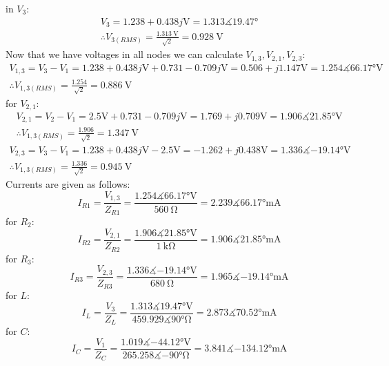 \documentclass[letterpaper]{article}
\begin{document}
in $V_3$:
\begin{gather*}
    V_3 = 1.238+0.438j\si{\volt} = 1.313\measuredangle\ang{19.47}\\ 
    \therefore V_{3(RMS)} = \frac{\SI{1.313}{\volt}}{\sqrt{2}} = \SI{0.928}{\volt} 
\end{gather*}
Now that we have voltages in all nodes we can calculate $V_{1,3},V_{2,1},V_{2,3}$:
\begin{gather*}
    V_{1,3} = V_3 - V_1 = 1.238+0.438j\si{\volt} + 0.731-0.709j\si{\volt} = 0.506+j1.147\si{\volt} =
    1.254\measuredangle\ang{66.17}\si{\volt}\\
    \therefore V_{1,3(RMS)} = \frac{1.254}{\sqrt{2}} = \SI{0.886}{\volt}
\end{gather*}
for $V_{2,1}$:
\begin{gather*}
    V_{2,1} = V_2 - V_1 = 2.5\si{\volt} + 0.731-0.709j\si{\volt} = 1.769+j0.709\si{\volt} =
    1.906\measuredangle\ang{21.85}\si{\volt}\\
    \therefore V_{1,3(RMS)} = \frac{1.906}{\sqrt{2}} = \SI{1.347}{\volt}
\end{gather*}
\begin{gather*}
    V_{2,3} = V_3 - V_1 = 1.238+0.438j\si{\volt} - 2.5\si{\volt} = -1.262+j0.438\si{\volt} =
    1.336\measuredangle\ang{-19.14}\si{\volt}\\
    \therefore V_{1,3(RMS)} = \frac{1.336}{\sqrt{2}} = \SI{0.945}{\volt}
\end{gather*}
Currents are given as follows:
\[I_{R1} = \frac{V_{1,3}}{Z_{R1}} = \frac{1.254\measuredangle\ang{66.17}\si{\volt}}{\SI{560}{\ohm}} =
2.239\measuredangle\ang{66.17}\si{\milli\ampere}\]
for $R_2$:
\[I_{R2} = \frac{V_{2,1}}{Z_{R2}} = \frac{1.906\measuredangle\ang{21.85}\si{\volt}}{\SI{1}{\kilo\ohm}} =
1.906\measuredangle\ang{21.85}\si{\milli\ampere}\]
for $R_3$:
\[I_{R3} = \frac{V_{2,3}}{Z_{R3}} = \frac{1.336\measuredangle\ang{-19.14}\si{\volt}}{\SI{680}{\ohm}} =
1.965\measuredangle\ang{-19.14}\si{\milli\ampere}\]
for $L$:
\[I_{L} = \frac{V_{3}}{Z_{L}} = \frac{1.313\measuredangle\ang{19.47}\si{\volt}}{459.929\measuredangle\ang{90}\si{\ohm}} =
2.873\measuredangle\ang{70.52}\si{\milli\ampere}\]
for $C$:
\[I_{C} = \frac{V_{1}}{Z_{C}} =
\frac{1.019\measuredangle\ang{-44.12}\si{\volt}}{265.258\measuredangle\ang{-90}\si{\ohm}} =
3.841\measuredangle\ang{-134.12}\si{\milli\ampere}\]
\end{document}
